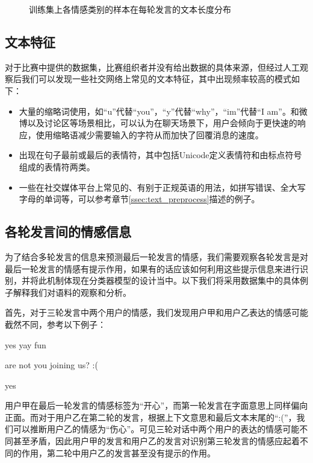 \begin{figure}[h]
  \caption{训练集上各情感类别的样本在每轮发言的文本长度分布}

  \label{fig:context_emo_train_class_len}
\end{figure}

\subsection{文本特征}
\label{ssec:exp_context_emo_data_text}

对于比赛中提供的数据集，比赛组织者并没有给出数据的具体来源，但经过人工观察后我们可以发现一些社交网络上常见的文本特征，其中出现频率较高的模式如下：

\begin{itemize}

\item 大量的缩略词使用，如“u”代替“you”，“y”代替“why”，“im”代替“I am”。和微博以及讨论区等场景相比，可以认为在聊天场景下，用户会倾向于更快速的响应，使用缩略语减少需要输入的字符从而加快了回覆消息的速度。

\item 出现在句子最前或最后的表情符，其中包括Unicode定义表情符和由标点符号组成的表情符两类。

\item 一些在社交媒体平台上常见的、有别于正规英语的用法，如拼写错误、全大写字母的单词等，可以参考章节\ref{ssec:text_preprocess}描述的例子。

\end{itemize}

\subsection{各轮发言间的情感信息}
\label{ssec:exp_context_emo_multi_turn_analyse}

为了结合多轮发言的信息来预测最后一轮发言的情感，我们需要观察各轮发言是对最后一轮发言的情感有提示作用，如果有的话应该如何利用这些提示信息来进行识别，并将此机制体现在分类器模型的设计当中。以下我们将采用数据集中的具体例子解释我们对语料的观察和分析。

首先，对于三轮发言中两个用户的情感，我们发现用户甲和用户乙表达的情感可能截然不同，参考以下例子：

 yes yay fun\par
{} are not you joining us? :( \par
{} yes\par

用户甲在最后一轮发言的情感标签为“开心”，而第一轮发言在字面意思上同样偏向正面。而对于用户乙在第二轮的发言，根据上下文意思和最后文本末尾的“:(”，我们可以推断用户乙的情感为“伤心”。可见三轮对话中两个用户的表达的情感可能不同甚至矛盾，因此用户甲的发言和用户乙的发言对识别第三轮发言的情感应起着不同的作用，第二轮中用户乙的发言甚至没有提示的作用。

